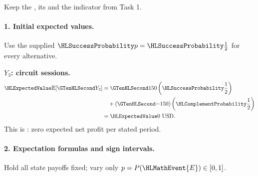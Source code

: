 Keep the , its  and the indicator from Task 1.
\paragraph{1. Initial expected values.}
Use the supplied $\SuccessProb{p}=\SuccessProb{\frac{1}{2}}$ for every alternative.
\noindent\begin{minipage}[t]{.48\linewidth}
\textbf{$Y_3$: circuit sessions.}
\[
\begin{aligned}
\ExpectedValue{\mathbb E}[\Money{Y_3}]&=\Money{150}\left(\SuccessProb{\frac{1}{2}}\right)\\
&\quad +(\Money{-150})\left(\FailureProb{\frac{1}{2}}\right)\\
&=\ExpectedValue{0\ \text{USD}}.
\end{aligned}
\]
This is : zero expected net profit per stated period.
\end{minipage}\par
{}\paragraph{2. Expectation formulas and sign intervals.}
Hold all state payoffs fixed; vary only $p=P(\HLMathEvent{E})\in\left[0,1\right]$.
